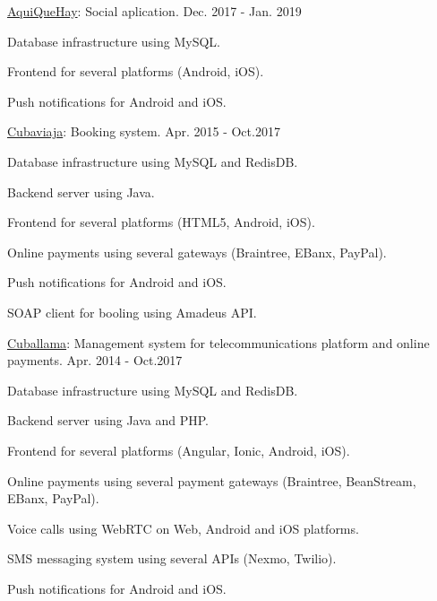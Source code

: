 \begin{cventries}
  \cventry
    {\href{https://aquiquehay.com.ec/}{AquiQueHay}: Social aplication.} %
    {} %
    {} %
    {Dec. 2017 - Jan. 2019} %
    {
      \begin{cvitems} %
        \item {Database infrastructure using MySQL.}
        \item {Frontend for several platforms (Android, iOS).}
        \item {Push notifications for Android and iOS.}
      \end{cvitems}
    }

  \cventry
    {\href{https://www.cuballama.com/viajes/vuelos}{Cubaviaja}: Booking system.} %
    {} %
    {} %
    {Apr. 2015 - Oct.2017} %
    {
      \begin{cvitems} %
        \item {Database infrastructure using MySQL and RedisDB.}
        \item {Backend server using Java.}
        \item {Frontend for several platforms (HTML5, Android, iOS).}
        \item {Online payments using several gateways (Braintree, EBanx, PayPal).}
        \item {Push notifications for Android and iOS.}
        \item {SOAP client for booling using Amadeus API.}
      \end{cvitems}
    }

  \cventry
    {\href{https://www.cuballama.com/}{Cuballama}: Management system for telecommunications platform and online payments.} %
    {} %
    {} %
    {Apr. 2014 - Oct.2017} %
    {
      \begin{cvitems} %
        \item {Database infrastructure using MySQL and RedisDB.}
        \item {Backend server using Java and PHP.}
        \item {Frontend for several platforms (Angular, Ionic, Android, iOS).}
        \item {Online payments using several payment gateways (Braintree, BeanStream, EBanx, PayPal).}
        \item {Voice calls using WebRTC on Web, Android and iOS platforms.}
        \item {SMS messaging system using several APIs (Nexmo, Twilio).}
        \item {Push notifications for Android and iOS.}
      \end{cvitems}
    }

\end{cventries}
